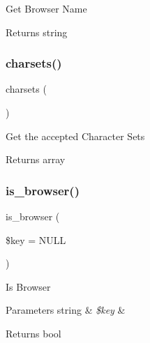 Get Browser Name

\begin{DoxyReturn}{Returns}
string 
\end{DoxyReturn}
\mbox{\label{class_c_i___user__agent_a1c3819a3fa2777b0b0f2c8ab5d97d833}} 
\subsubsection{\texorpdfstring{charsets()}{charsets()}}
{\footnotesize\ttfamily charsets (\begin{DoxyParamCaption}{ }\end{DoxyParamCaption})}

Get the accepted Character Sets

\begin{DoxyReturn}{Returns}
array 
\end{DoxyReturn}
\mbox{\label{class_c_i___user__agent_a3a0c84a9f4a781e53c7529af8a5075ae}} 
\subsubsection{\texorpdfstring{is\+\_\+browser()}{is\_browser()}}
{\footnotesize\ttfamily is\+\_\+browser (\begin{DoxyParamCaption}\item[{}]{\$key = {\ttfamily NULL} }\end{DoxyParamCaption})}

Is Browser


\begin{DoxyParams}[1]{Parameters}
string & {\em \$key} & \\
\hline
\end{DoxyParams}
\begin{DoxyReturn}{Returns}
bool 
\end{DoxyReturn}
\mbox{\label{class_c_i___user__agent_ab0ec0b7f6a5eeaf00e35743c25e68dfe}} 
